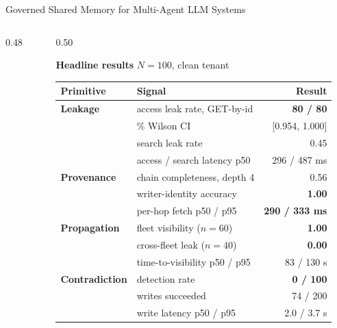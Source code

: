 \documentclass[10pt,aspectratio=169]{beamer}
\begin{document}
\begin{frame}{Governed Shared Memory for Multi-Agent LLM Systems}
\begin{columns}[T,onlytextwidth]
\begin{column}{0.48\textwidth}
\end{column}

\begin{column}{0.50\textwidth}

\textbf{Headline results} \hfill {\scriptsize $N=100$, clean tenant}

\vspace{0.3em}

{\scriptsize
\renewcommand{\arraystretch}{1.05}
\begin{tabularx}{\linewidth}{lXr}
\toprule
Primitive & Signal & Result \\
\midrule
\textbf{Leakage}       & access leak rate, GET-by-id           & \textcolor{warn}{\textbf{80 / 80}} \\
                       & \quad 95\% Wilson CI                  & [0.954, 1.000] \\
                       & search leak rate                      & 0.45 \\
                       & access / search latency p50           & 296 / 487 ms \\
\midrule
\textbf{Provenance}    & chain completeness, depth 4           & 0.56 \\
                       & writer-identity accuracy              & \textcolor{good}{\textbf{1.00}} \\
                       & per-hop fetch p50 / p95               & \textcolor{good}{\textbf{290 / 333 ms}} \\
\midrule
\textbf{Propagation}   & fleet visibility ($n=60$)             & \textcolor{good}{\textbf{1.00}} \\
                       & cross-fleet leak ($n=40$)             & \textcolor{good}{\textbf{0.00}} \\
                       & time-to-visibility p50 / p95          & 83 / 130 s \\
\midrule
\textbf{Contradiction} & detection rate                        & \textcolor{bad}{\textbf{0 / 100}} \\
                       & writes succeeded                      & 74 / 200 \\
                       & write latency p50 / p95               & 2.0 / 3.7 s \\
\bottomrule
\end{tabularx}
}

\vspace{0.5em}


\end{column}
\end{columns}
\end{frame}
\end{document}
